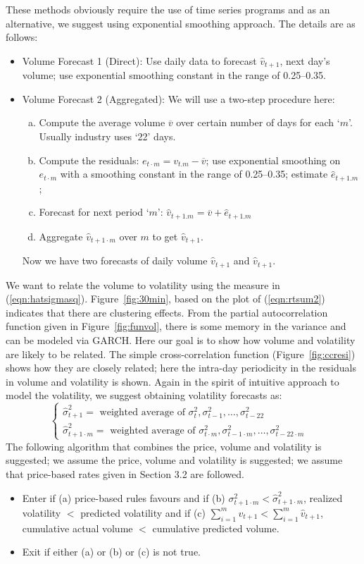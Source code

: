 	
These methods obviously require the use of time series programs and as an alternative, we suggest using exponential smoothing approach. The details are as follows:
	\begin{itemize}
	\item Volume Forecast 1 (Direct): Use daily data to forecast $\hat{v}_{t+1}$, next day's volume; use exponential smoothing constant in the range of 0.25--0.35.
	\item Volume Forecast 2 (Aggregated): We will use a two-step procedure here:
		\begin{enumerate}[(a)]
		\item Compute the average volume $\overline{v}$ over certain number of days for each `$m$'. Usually industry uses `22' days.
		\item Compute the residuals: $e_{t\cdot m} = v_{t . m} - \overline{v}$; use exponential smoothing on $e_{t\cdot m}$ with a smoothing constant in the range of 0.25--0.35; estimate $\hat{e}_{t+1 . m}$;
		\item Forecast for next period `$m$': $\hat{v}_{t+1. m}=\overline{v}+\hat{e}_{t+1 . m}$
		\item Aggregate $\hat{v}_{t+1\cdot m}$ over $m$ to get $\hat{v}_{t+1}$. 
		\end{enumerate}
	Now we have two forecasts of daily volume $\hat{v}_{t+1}$ and $\hat{v}_{t+1}$.
	\end{itemize}
We want to relate the volume to volatility using the measure in (\ref{eqn:hatsigmasq}). Figure~\ref{fig:30min}, based on the plot of (\ref{eqn:rtsum2}) indicates that there are clustering effects. From the partial autocorrelation function given in Figure~\ref{fig:funvol}, there is some memory in the variance and can be modeled via GARCH. Here our goal is to show how volume and volatility are likely to be related. The simple cross-correlation function (Figure~\ref{fig:ccresi}) shows how they are closely related; here the intra-day periodicity in the residuals in volume and volatility is shown. Again in the spirit of intuitive approach to model the volatility, we suggest obtaining volatility forecasts as:
	\[
	\begin{cases}
	\hat{\sigma}_{t+1}^2 = \text{ weighted average of } \sigma_t^2, \sigma_{t-1}^2, \ldots, \sigma_{t-22}^2 & \\
	\hat{\sigma}^2_{t+1 \cdot m}= \text{ weighted average of } \sigma_{t\cdot m}^2, \sigma_{t-1 \cdot m}^2, \ldots, \sigma_{t-22\cdot m}^2 & 
	\end{cases}
	\]
The following algorithm that combines the price, volume and volatility is suggested; we assume the price, volume and volatility is suggested; we assume that price-based rates given in Section 3.2 are followed.
	\begin{itemize}
	\item Enter if (a) price-based rules favours and if (b) $\sigma_{t+1\cdot m}^2< \hat{\sigma}_{t+1\cdot m}^2$, realized volatility $<$ predicted volatility and if (c) $\sum_{i=1}^m v_{t+1} < \sum_{i=1}^m \hat{v}_{t+1}$, cumulative actual volume $<$ cumulative predicted volume. 
	\item Exit if either (a) or (b) or (c) is not true. 
	\end{itemize}
 
